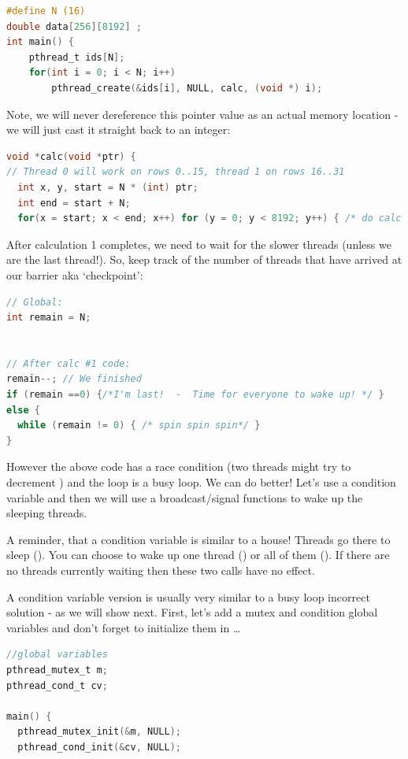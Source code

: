 \begin{lstlisting}[language=C]
#define N (16)
double data[256][8192] ;
int main() {
    pthread_t ids[N];
    for(int i = 0; i < N; i++)  
        pthread_create(&ids[i], NULL, calc, (void *) i);
\end{lstlisting}

Note, we will never dereference this pointer value as an actual memory location - we will just cast it straight back to an integer:

\begin{lstlisting}[language=C]
void *calc(void *ptr) {
// Thread 0 will work on rows 0..15, thread 1 on rows 16..31
  int x, y, start = N * (int) ptr;
  int end = start + N; 
  for(x = start; x < end; x++) for (y = 0; y < 8192; y++) { /* do calc #1 */ }
\end{lstlisting}

After calculation 1 completes, we need to wait for the slower threads (unless we are the last thread!). So, keep track of the number of threads that have arrived at our barrier aka `checkpoint':

\begin{lstlisting}[language=C]
// Global: 
int remain = N;


// After calc #1 code:
remain--; // We finished
if (remain ==0) {/*I'm last!  -  Time for everyone to wake up! */ }
else {
  while (remain != 0) { /* spin spin spin*/ }
}
\end{lstlisting}

However the above code has a race condition (two threads might try to decrement ) and the loop is a busy loop. We can do better! Let's use a condition variable and then we will use a broadcast/signal functions to wake up the sleeping threads.

A reminder, that a condition variable is similar to a house! Threads go there to sleep (). You can choose to wake up one thread () or all of them (). If there are no threads currently waiting then these two calls have no effect.

A condition variable version is usually very similar to a busy loop incorrect solution - as we will show next. First, let's add a mutex and condition global variables and don't forget to initialize them in  \ldots{}

\begin{lstlisting}[language=C]
//global variables
pthread_mutex_t m;
pthread_cond_t cv;

main() {
  pthread_mutex_init(&m, NULL);
  pthread_cond_init(&cv, NULL);
\end{lstlisting}

